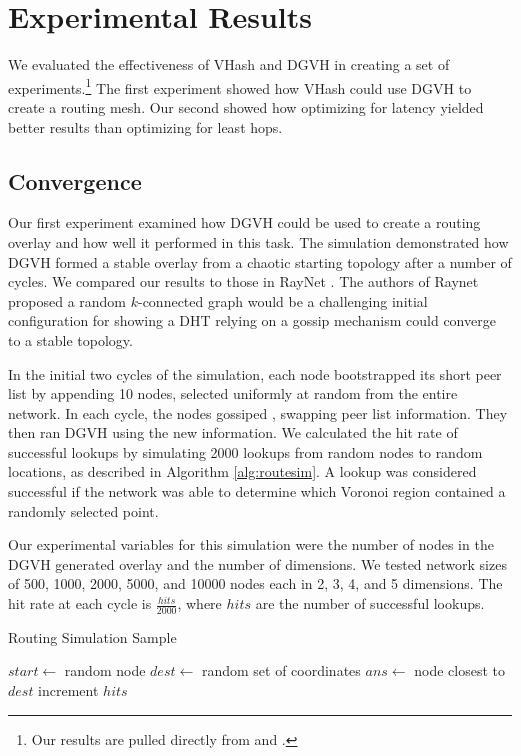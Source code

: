 \section{Experimental Results}
We evaluated the effectiveness of VHash and DGVH in creating a set of experiments.\footnote{Our results are pulled directly from \cite{dgvh} and \cite{vhash}.}
The first experiment showed how VHash could use DGVH to create a routing mesh.
Our second showed how optimizing for latency yielded better results than optimizing for least hops.

\subsection{Convergence}
Our first experiment examined how DGVH could be used to create a routing overlay and how well it performed in this task.
The simulation demonstrated how DGVH  formed a stable overlay from a chaotic starting topology after a number of cycles.
We compared our results to those in RayNet \cite{raynet}.
The authors of Raynet proposed a random $k$-connected graph would be a challenging initial configuration for showing a DHT relying on a gossip mechanism could converge to a stable topology.

In the initial two cycles of the simulation, each node bootstrapped its short peer list by appending 10 nodes, selected uniformly at random from the entire network.
In each cycle, the nodes gossiped , swapping peer list information.
They then ran DGVH using the new information.
We calculated the hit rate of successful lookups by simulating 2000 lookups from random nodes to random locations, as described in Algorithm \ref{alg:routesim}.
A lookup was considered successful if the network was able to determine which Voronoi region contained a randomly selected point.

Our experimental variables for this simulation were the number of nodes in the DGVH generated overlay and the number of dimensions.
We tested network sizes of 500, 1000, 2000, 5000, and 10000 nodes each in 2, 3, 4, and 5 dimensions.
The hit rate at each cycle is $\frac{hits}{2000}$, where $hits$ are the number of successful lookups.




\begin{algorithm}
	\caption{Routing Simulation Sample}
	\label{alg:routesim}
	\begin{algorithmic}[1]  %
		\State $start \leftarrow$ random node
		\State$dest \leftarrow$ random set of coordinates
		\State $ans \leftarrow$ node closest to $dest$
		\State increment $hits$
		\EndIf
	\end{algorithmic}
\end{algorithm}

